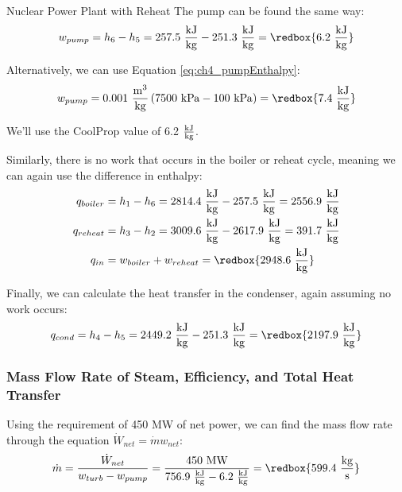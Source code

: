 \begin{example}[label=ex:RankineReheat]{Nuclear Power Plant with Reheat}
  The pump can be found the same way:
  \begin{equation*}
    w_{pump} = h_6 - h_5 = 257.5\ \frac{\rm kJ}{\rm kg} - 251.3\ \frac{\rm kJ}{\rm kg} = \redbox{6.2\ \frac{\rm kJ}{\rm kg}}
  \end{equation*}

  Alternatively, we can use Equation \ref{eq:ch4_pumpEnthalpy}:
  \begin{equation*}
    w_{pump} = 0.001\ \frac{\rm m^3}{\rm kg} \left(7500\ {\rm kPa} - 100\ {\rm kPa}\right) = \redbox{7.4\ \frac{\rm kJ}{\rm kg}}
  \end{equation*}

  We'll use the CoolProp value of 6.2 $\frac{\rm kJ}{\rm kg}$.
  
  Similarly, there is no work that occurs in the boiler or reheat cycle, meaning we can again use the difference in enthalpy:
  \begin{align*}
    q_{boiler} &= h_1 - h_6 = 2814.4\ \frac{\rm kJ}{\rm kg} - 257.5\ \frac{\rm kJ}{\rm kg} = 2556.9\ \frac{\rm kJ}{\rm kg} \\
    q_{reheat} &= h_3 - h_2 = 3009.6\ \frac{\rm kJ}{\rm kg} - 2617.9\ \frac{\rm kJ}{\rm kg} = 391.7\ \frac{\rm kJ}{\rm kg} \\
    q_{in} &= w_{boiler} + w_{reheat} = \redbox{2948.6\ \frac{\rm kJ}{\rm kg}}
  \end{align*}

  Finally, we can calculate the heat transfer in the condenser, again assuming no work occurs:
   \begin{equation*}
    q_{cond} = h_4 - h_5 = 2449.2\ \frac{\rm kJ}{\rm kg} - 251.3\ \frac{\rm kJ}{\rm kg} = \redbox{2197.9\ \frac{\rm kJ}{\rm kg}}
  \end{equation*}
  \subsubsection*{Mass Flow Rate of Steam, Efficiency, and Total Heat Transfer}
  Using the requirement of 450 MW of net power, we can find the mass flow rate through the equation $\dot{W}_{net} = \dot{m}w_{net}$:
  \begin{equation*}
    \dot{m} = \frac{\dot{W}_{net}}{w_{turb}-w_{pump}} = \frac{450\ \rm MW}{756.9\ \frac{\rm kJ}{\rm kg}-6.2\ \frac{\rm kJ}{\rm kg}} = \redbox{599.4\ \frac{\rm kg}{\rm s}}
  \end{equation*}


\end{example}
